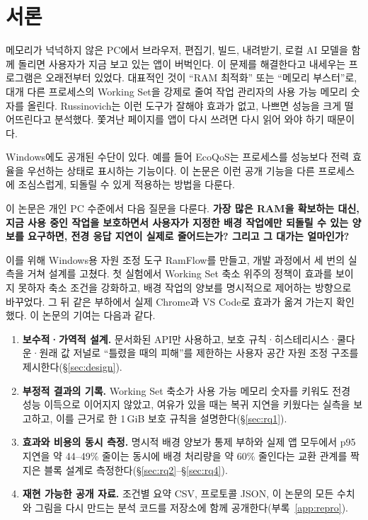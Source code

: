 \documentclass[11pt]{article}
\begin{document}
\section{서론}
\label{sec:intro}

메모리가 넉넉하지 않은 PC에서 브라우저, 편집기, 빌드, 내려받기, 로컬 AI 모델을 함께 돌리면 사용자가 지금 보고 있는 앱이 버벅인다. 이 문제를 해결한다고 내세우는 프로그램은 오래전부터 있었다. 대표적인 것이 ``RAM 최적화'' 또는 ``메모리 부스터''로, 대개 다른 프로세스의 Working Set을 강제로 줄여 작업 관리자의 사용 가능 메모리 숫자를 올린다. Russinovich는 이런 도구가 잘해야 효과가 없고, 나쁘면 성능을 크게 떨어뜨린다고 분석했다\citep{russinovich2004}. 쫓겨난 페이지를 앱이 다시 쓰려면 다시 읽어 와야 하기 때문이다\citep{mswset}.

Windows에도 공개된 수단이 있다. 예를 들어 EcoQoS는 프로세스를 성능보다 전력 효율을 우선하는 상태로 표시하는 기능이다\citep{ecoqos2021}. 이 논문은 이런 공개 기능을 다른 프로세스에 조심스럽게, 되돌릴 수 있게 적용하는 방법을 다룬다.

이 논문은 개인 PC 수준에서 다음 질문을 다룬다. \textbf{가장 많은 RAM을 확보하는 대신, 지금 사용 중인 작업을 보호하면서 사용자가 지정한 배경 작업에만 되돌릴 수 있는 양보를 요구하면, 전경 응답 지연이 실제로 줄어드는가? 그리고 그 대가는 얼마인가?}

이를 위해 Windows용 자원 조정 도구 RamFlow를 만들고, 개발 과정에서 세 번의 실측을 거쳐 설계를 고쳤다. 첫 실험에서 Working Set 축소 위주의 정책이 효과를 보이지 못하자 축소 조건을 강화하고, 배경 작업의 양보를 명시적으로 제어하는 방향으로 바꾸었다. 그 뒤 같은 부하에서 실제 Chrome과 VS Code로 효과가 옮겨 가는지 확인했다. 이 논문의 기여는 다음과 같다.

\begin{enumerate}
  \item \textbf{보수적·가역적 설계.} 문서화된 API만 사용하고, 보호 규칙·히스테리시스·쿨다운·원래 값 저널로 ``틀렸을 때의 피해''를 제한하는 사용자 공간 자원 조정 구조를 제시한다(\S\ref{sec:design}).
  \item \textbf{부정적 결과의 기록.} Working Set 축소가 사용 가능 메모리 숫자를 키워도 전경 성능 이득으로 이어지지 않았고, 여유가 있을 때는 복귀 지연을 키웠다는 실측을 보고하고, 이를 근거로 한 1\,GiB 보호 규칙을 설명한다(\S\ref{sec:rq1}).
  \item \textbf{효과와 비용의 동시 측정.} 명시적 배경 양보가 통제 부하와 실제 앱 모두에서 p95 지연을 약 44--49\% 줄이는 동시에 배경 처리량을 약 60\% 줄인다는 교환 관계를 짝지은 블록 설계로 측정한다(\S\ref{sec:rq2}--\S\ref{sec:rq4}).
  \item \textbf{재현 가능한 공개 자료.} 조건별 요약 CSV, 프로토콜 JSON, 이 논문의 모든 수치와 그림을 다시 만드는 분석 코드를 저장소에 함께 공개한다(부록~\ref{app:repro}).
\end{enumerate}
\end{document}
